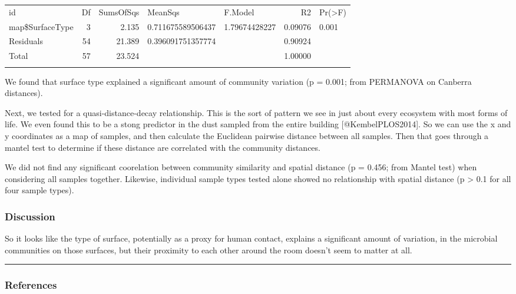 \begin{longtable}[c]{@{}lrrllrl@{}}
\hline\noalign{\medskip}
id & Df & SumsOfSqs & MeanSqs & F.Model & R2 & Pr(\textgreater{}F)
\\\noalign{\medskip}
\hline\noalign{\medskip}
map\$SurfaceType & 3 & 2.135 & 0.711675589506437 & 1.79674428227 &
0.09076 & 0.001
\\\noalign{\medskip}
Residuals & 54 & 21.389 & 0.396091751357774 & & 0.90924 &
\\\noalign{\medskip}
Total & 57 & 23.524 & & & 1.00000 &
\\\noalign{\medskip}
\hline
\end{longtable}

We found that surface type explained a significant amount of community
variation (p = 0.001; from PERMANOVA on Canberra distances).

Next, we tested for a quasi-distance-decay relationship. This is the
sort of pattern we see in just about every ecosystem with most forms of
life. We even found this to be a stong predictor in the dust sampled
from the entire building {[}@KembelPLOS2014{]}. So we can use the x and
y coordinates as a map of samples, and then calculate the Euclidean
pairwise distance between all samples. Then that goes through a mantel
test to determine if these distance are correlated with the community
distances.

We did not find any significant coorelation between community similarity
and spatial distance (p = 0.456; from Mantel test) when considering all
samples together. Likewise, individual sample types tested alone showed
no relationship with spatial distance (p \textgreater{} 0.1 for all four
sample types).

\subsubsection{Discussion}

So it looks like the type of surface, potentially as a proxy for human
contact, explains a significant amount of variation, in the microbial
communities on those surfaces, but their proximity to each other around
the room doesn't seem to matter at all.

\begin{center}\rule{3in}{0.4pt}\end{center}

\subsubsection{References}
